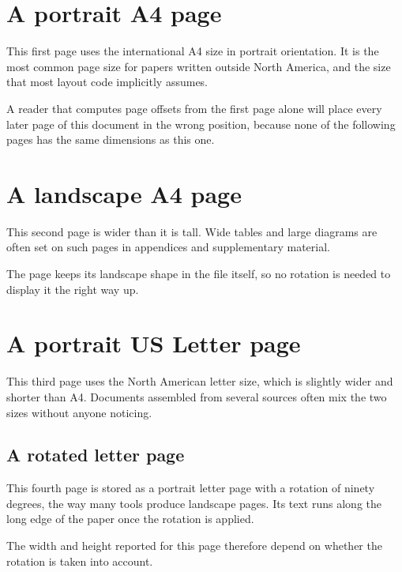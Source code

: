 \documentclass[10pt,paper=a4,pagesize,DIV=12]{scrartcl}
\begin{document}
\section{A portrait A4 page}

This first page uses the international A4 size in portrait orientation. It
is the most common page size for papers written outside North America, and
the size that most layout code implicitly assumes.

A reader that computes page offsets from the first page alone will place
every later page of this document in the wrong position, because none of the
following pages has the same dimensions as this one.

\clearpage
\recalctypearea
\section{A landscape A4 page}

This second page is wider than it is tall. Wide tables and large diagrams
are often set on such pages in appendices and supplementary material.

\begin{center}
\end{center}

The page keeps its landscape shape in the file itself, so no rotation is
needed to display it the right way up.

\clearpage
\recalctypearea
\section{A portrait US Letter page}

This third page uses the North American letter size, which is slightly
wider and shorter than A4. Documents assembled from several sources often
mix the two sizes without anyone noticing.

\clearpage
\begin{landscape}
\section{A rotated letter page}

This fourth page is stored as a portrait letter page with a rotation of
ninety degrees, the way many tools produce landscape pages. Its text runs
along the long edge of the paper once the rotation is applied.

The width and height reported for this page therefore depend on whether the
rotation is taken into account.
\end{landscape}
\end{document}
